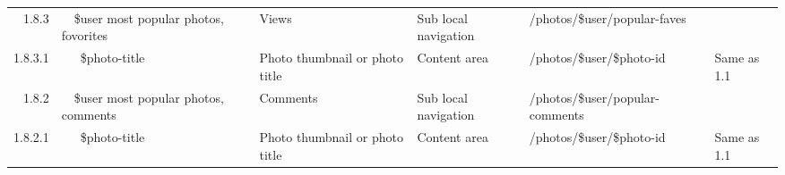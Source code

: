 \documentclass[12pt,a4paper]{article}
\begin{document}
\begin{landscape}
\begin{table}[h!b!p!]
\begin{center}
\begin{tiny}
\begin{tabular}{r|l|l|l|l|p{3cm}}
                1.8.3 &
                ~~\$user most popular photos, fovorites &
                Views &
                Sub local navigation &
                /photos/\$user/popular-faves &
                \\

                  1.8.3.1 &
                  ~~~\$photo-title &
                  Photo thumbnail or photo title &
                  Content area &
                  /photos/\$user/\$photo-id &
                  Same as 1.1 \\

                1.8.2 &
                ~~\$user most popular photos, comments &
                Comments &
                Sub local navigation &
                /photos/\$user/popular-comments &
                \\

                  1.8.2.1 &
                  ~~~\$photo-title &
                  Photo thumbnail or photo title &
                  Content area &
                  /photos/\$user/\$photo-id &
                  Same as 1.1 \\

          \end{tabular}
        \rm
      \end{tiny}
    \end{center}
  \end{table}
\end{landscape}
\end{document}
